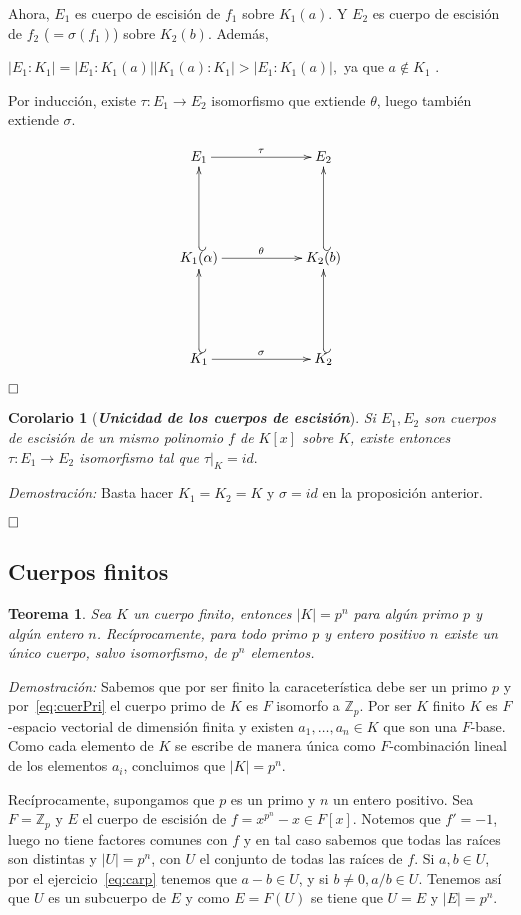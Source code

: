 \documentclass[12pt]{article}
\newtheorem{theorem}{Teorema}[section]
\newtheorem{corolario}{Corolario}[theorem]
\begin{document}
Ahora, $E_{1}$ es cuerpo de escisión de $f_{1}$ sobre $K_{1}(a)$. Y $E_{2}$ es cuerpo de escisión de $f_{2}$ ($= \sigma(f_{1})$) sobre $K_{2}(b)$. Además, \begin{center}$|E_{1} : K_{1}| = |E_{1} : K_{1}(a)| |K_{1}(a) : K_{1} | > |E_{1}:K_{1}(a)|,$ ya que $a \notin K_{1}$ .\end{center}

Por inducción, existe $\tau \colon E_{1} \longrightarrow E_{2}$ isomorfismo que extiende $\theta$, luego también extiende $\sigma$. 

$$\xymatrix @=2cm {E_{1}\ar[r]^{\tau} & E_{2} \\ K_{1}(\alpha)\ar[r]^{\theta} \ar@{_(->}[u] & K_{2}(b) \ar@{_(->}[u] \\ K_{1} \ar[r]^{\sigma} \ar@{_(->}[u] & K_{2} \ar@{_(->}[u]  }$$

$\hfill \square$

\begin{corolario}[\textbf{\textit{Unicidad de los cuerpos de escisión}}] \label{eq:unicuer} Si $E_{1}, E_{2}$ son cuerpos de escisión de un mismo polinomio $f$ de $K[x]$ sobre $K$, existe entonces $\tau \colon E_{1} \longrightarrow E_{2}$ isomorfismo tal que $\left.\tau \right|_{K} = id.$
\end{corolario}
\emph{Demostración: } Basta hacer $K_{1} = K_{2} = K$ y $\sigma = id$ en la proposición anterior.

$\hfill \square$

\subsection{Cuerpos finitos}

\begin{theorem}
Sea $K$ un cuerpo finito, entonces $|K| = p^n$ para algún primo $p$ y algún entero $n$. Recíprocamente, para todo primo $p$ y entero positivo $n$ existe un único cuerpo, salvo isomorfismo, de $p^n$ elementos.
\end{theorem}
\emph{Demostración: }Sabemos que por ser finito la caraceterística debe ser un primo $p$ y por~\ref{eq:cuerPri} el cuerpo primo de $K$ es $F$ isomorfo a $\mathbb{Z}_p$. Por ser $K$ finito $K$ es $F$-espacio vectorial de dimensión finita y existen $a_1, \ldots, a_n \in K$ que son una $F$-base. Como cada elemento de $K$ se escribe de manera única como $F$-combinación lineal de los elementos $a_i$, concluimos que $|K| = p^n$.

Recíprocamente, supongamos que $p$ es un primo y $n$ un entero positivo. Sea $F = \mathbb{Z}_p$ y $E$ el cuerpo de escisión de $f = x^{p^n}-x \in F[x]$. Notemos que $f' = -1$, luego no tiene factores comunes con $f$ y en tal caso sabemos que todas las raíces son distintas y $|U| = p^n$, con $U$ el conjunto de todas las raíces de $f$. Si $a,b \in U$, por el ejercicio~\ref{eq:carp} tenemos que $a-b \in U$, y si $b \neq 0, a/b \in U$. Tenemos así que $U$ es un subcuerpo de $E$ y como $E = F(U)$ se tiene que $U = E$ y $|E| = p^n$.
\end{document}
